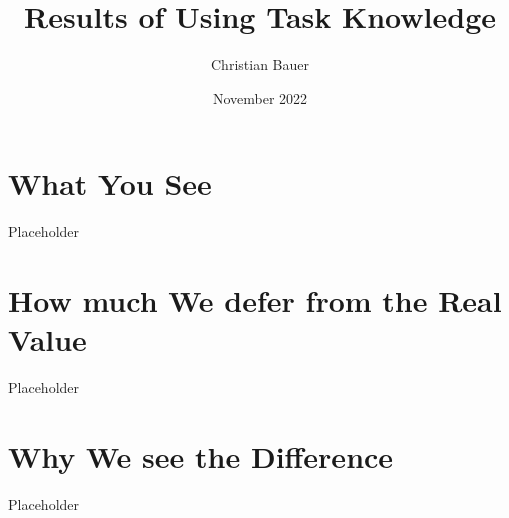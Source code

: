 \documentclass{article}
\title{Results of Using Task Knowledge}
\author{Christian Bauer}
\date{November 2022}
\begin{document}
  \maketitle


  \section{What You See}

    Placeholder

  \section{How much We defer from the Real Value}

    Placeholder

  \section{Why We see the Difference}


    Placeholder
\end{document}
